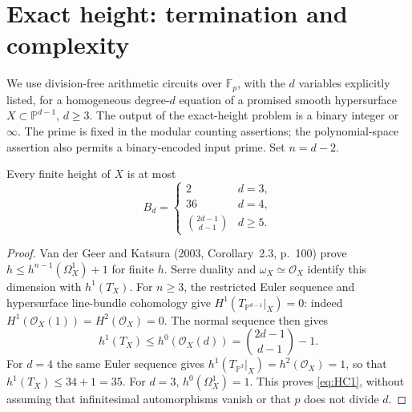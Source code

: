 \section{Exact height: termination and complexity}
We use division-free arithmetic circuits over $\mathbb F_p$, with the
$d$ variables explicitly listed, for a homogeneous degree-$d$ equation
of a promised smooth hypersurface $X\subset\mathbb P^{d-1}$, $d\ge3$.
The output of the exact-height problem is a binary integer or $\infty$.
The prime is fixed in the modular counting assertions; the polynomial-space
assertion also permits a binary-encoded input prime.  Set $n=d-2$.

\begin{proposition}
Every finite height of $X$ is at most
\begin{equation}
 B_d=\begin{cases}
 2&d=3,\\
 36&d=4,\\
 \binom{2d-1}{d-1}&d\ge5.
 \end{cases}
\label{eq:HC1}
\end{equation}
\end{proposition}
\begin{proof}
Van der Geer and Katsura (2003, Corollary~2.3, p.~100) prove
$h\le h^{n-1}(\Omega_X^1)+1$ for finite $h$.  Serre duality and
$\omega_X\simeq\mathcal O_X$ identify this dimension with $h^1(T_X)$.
For $n\ge3$, the restricted Euler sequence and hypersurface line-bundle
cohomology give $H^1(T_{\mathbb P^{d-1}}|_X)=0$: indeed
$H^1(\mathcal O_X(1))=H^2(\mathcal O_X)=0$.  The normal sequence
then gives
\[
 h^1(T_X)\le h^0(\mathcal O_X(d))
 =\binom{2d-1}{d-1}-1.
\]
For $d=4$ the same Euler sequence gives
$h^1(T_{\mathbb P^3}|_X)=h^2(\mathcal O_X)=1$, so that
$h^1(T_X)\le34+1=35$.  For $d=3$,
$h^0(\Omega_X^1)=1$.  This proves \eqref{eq:HC1}, without assuming that
infinitesimal automorphisms vanish or that $p$ does not divide $d$.
\end{proof}

